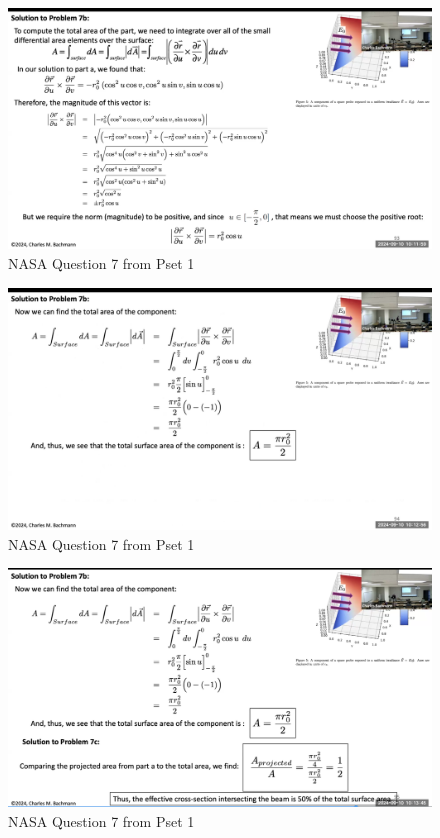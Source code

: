 \documentclass{article}
\begin{document}
\begin{figure}[h!]
\centering
\includegraphics[scale=.4]{Radiometry/Crux/Num7.png}
\caption{NASA Question 7 from Pset 1}
\label{fig:NASA Question}
\end{figure}

\begin{figure}[h!]
\centering
\includegraphics[scale=.4]{Radiometry/Crux/Num8.png}
\caption{NASA Question 7 from Pset 1}
\label{fig:NASA Question}
\end{figure}

\begin{figure}[h!]
\centering
\includegraphics[scale=.4]{Radiometry/Crux/Num9.png}
\caption{NASA Question 7 from Pset 1}
\label{fig:NASA Question}
\end{figure}
\end{document}
